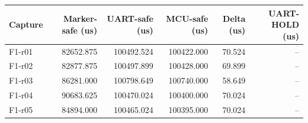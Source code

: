 \begin{tabular}{lrrrrr}
Capture & Marker-safe (us) & UART-safe (us) & MCU-safe (us) & Delta (us) & UART-HOLD (us) \\
\hline
F1-r01 & 82652.875 & 100492.524 & 100422.000 & 70.524 & -- \\
F1-r02 & 82877.875 & 100497.899 & 100428.000 & 69.899 & -- \\
F1-r03 & 86281.000 & 100798.649 & 100740.000 & 58.649 & -- \\
F1-r04 & 90683.625 & 100470.024 & 100400.000 & 70.024 & -- \\
F1-r05 & 84894.000 & 100465.024 & 100395.000 & 70.024 & -- \\
\end{tabular}
